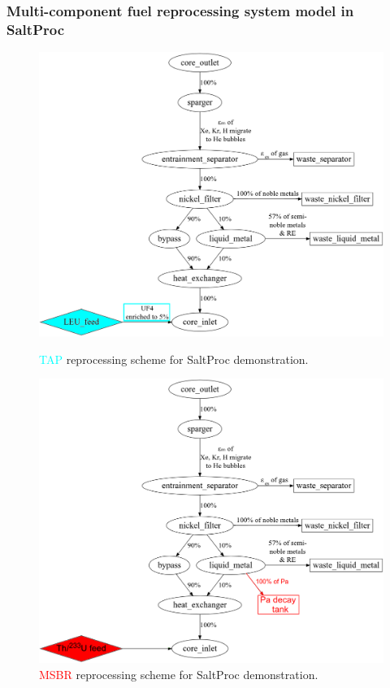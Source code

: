 \begin{frame}
\frametitle{Multi-component fuel reprocessing system model in SaltProc}       

\begin{figure}[htp!] %
	\centering
	\vspace{-2mm}
	\begin{overprint}
	\includegraphics[height=0.85\textheight]{./images/tap_saltproc_var_eps.png}
		\vspace{-2mm}
    \caption{\textcolor{cyan}{\gls{TAP}} reprocessing scheme for 
	SaltProc demonstration.}
	\includegraphics[height=0.85\textheight]{./images/msbr_saltproc_var_eps.png}
		\vspace{-2mm}
	\caption{\textcolor{red}{\gls{MSBR}} reprocessing scheme for 
	SaltProc demonstration.}
	\end{overprint}
\end{figure}

\end{frame}


